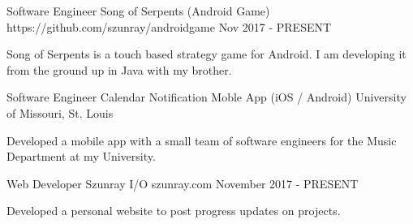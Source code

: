 

\vspace{-2mm}

\begin{cventries}


\cventry
{Software Engineer} %
{Song of Serpents (Android Game)} %
{https://github.com/szunray/androidgame} %
{Nov 2017 - PRESENT} %
{ %
\begin{cvitems}
\item {Song of Serpents is a touch based strategy game for Android. I am developing it from the ground up in Java with my brother. }
\end{cvitems}
}


\cventry
{Software Engineer} %
{Calendar Notification Moble App (iOS / Android)} %
{University of Missouri, St. Louis} %
{} %
{ %
\begin{cvitems}
\item {Developed a mobile app with a small team of software engineers for the Music Department at my University.} 
\end{cvitems}
}


\cventry
{Web Developer} %
{Szunray I/O} %
{szunray.com} %
{November 2017 - PRESENT} %
{ %
\begin{cvitems}
\item {Developed a personal website to post progress updates on projects.} 
\end{cvitems}
}


\vspace{-2mm}

\end{cventries}
